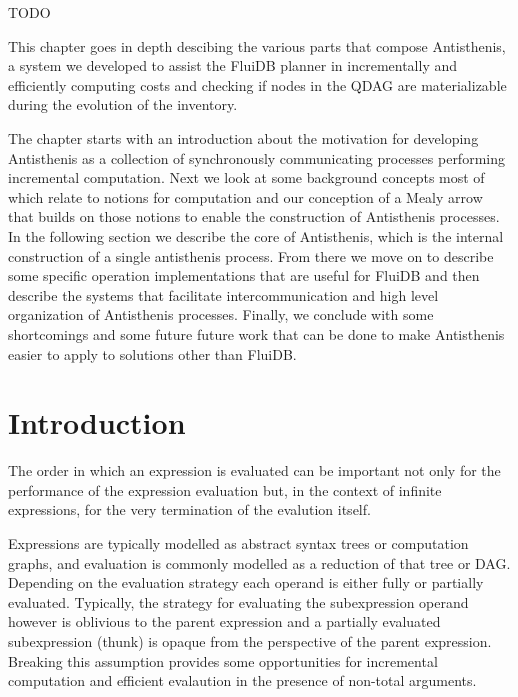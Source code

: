 \begin{summary}
\item TODO
\end{summary}

This chapter goes in depth descibing the various parts that compose
Antisthenis, a system we developed to assist the FluiDB planner in
incrementally and efficiently computing costs and checking if nodes in
the QDAG are materializable during the evolution of the inventory.

The chapter starts with an introduction about the motivation for
developing Antisthenis as a collection of synchronously communicating
processes performing incremental computation. Next we look at some
background concepts most of which relate to notions for computation
and our conception of a Mealy arrow that builds on those notions to
enable the construction of Antisthenis processes. In the following
section we describe the core of Antisthenis, which is the internal
construction of a single antisthenis process. From there we move on to
describe some specific operation implementations that are useful for
FluiDB and then describe the systems that facilitate
intercommunication and high level organization of Antisthenis
processes. Finally, we conclude with some shortcomings and some future
future work that can be done to make Antisthenis easier to apply to
solutions other than FluiDB.

\section{Introduction}
\label{sec:antisthenis_intro}

The order in which an expression is evaluated can be important not
only for the performance of the expression evaluation but, in the
context of infinite expressions, for the very termination of the
evalution itself.

Expressions are typically modelled as abstract syntax trees or
computation graphs, and evaluation is commonly modelled as a reduction
of that tree or DAG. Depending on the evaluation strategy each operand
is either fully or partially evaluated. Typically, the strategy for
evaluating the subexpression operand however is oblivious to the
parent expression and a partially evaluated subexpression (thunk) is
opaque from the perspective of the parent expression. Breaking this
assumption provides some opportunities for incremental computation and
efficient evalaution in the presence of non-total arguments.

